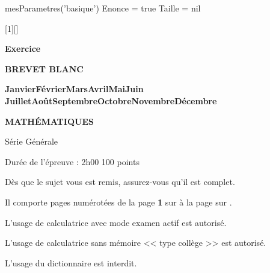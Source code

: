 \documentclass{classe-tex3R}
\newcommand{\monthyear}{\ifcase\month\or
  Janvier\or Février\or Mars\or Avril\or Mai\or Juin\or
  Juillet\or Août\or Septembre\or Octobre\or Novembre\or Décembre\fi
  \space\number\year
}
\begin{document}
\begin{luacode}
  mesParametres('basique')
  Enonce = true
  Taille = nil
\end{luacode}
\parametrage

[1][]{
    \large\bfseries Exercice \thecompteurexercice \hfill \contenubareme\par\medskip\mdseries\normalsize\BODY
}
  \ofoot{\mdseries\bfseries\thepage/\pageref{LastPage}}        

\begin{center}
  \bfseries BREVET BLANC
  
  \bfseries \monthyear
  
  \sautligne
  
\end{center}

\begin{tcolorbox}[
  colframe = black, 
  colback=black!0,
  coltitle=white,
  sharp corners,
  valign=center,
  top=2cm,
  bottom=0.5cm,
  left=0.5cm,
  enhanced,
  before skip=0cm,
]
\begin{center}
  \textbf{ MATHÉMATIQUES}
  
  Série Générale
  
  \sautligne
  
  
  Durée de l'épreuve : 2h00 \hfill 100 points
\end{center}
\end{tcolorbox}

\vfill

\begin{center}
  Dès que le sujet vous est remis, assurez-vous qu’il est complet.


  Il comporte \textbf{\pageref{LastPage}} pages numérotées de la page \textbf{1} sur \textbf{\pageref{LastPage}} à la page \textbf{\pageref{LastPage}} sur \textbf{\pageref{LastPage}}.
\end{center}

\sautligne

\begin{center}
  L'usage de calculatrice avec mode examen actif est autorisé.

  \sautligne
  
  L'usage de calculatrice sans mémoire << type collège >> est autorisé.
  
  \sautligne

  L'usage du dictionnaire est interdit.
\end{center}
\end{document}
